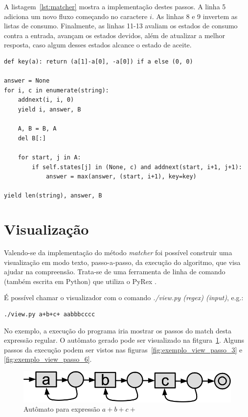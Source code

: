 \documentclass[a4paper,12pt,oneside,onecolumn]{uerj}
\begin{document}
A listagem~\ref{lst:matcher} mostra a implementação destes passos. A linha 5 adiciona um novo fluxo começando no caractere $i$. As linhas 8 e 9 invertem as listas de consumo. Finalmente, as linhas 11-13 avaliam os estados de consumo contra a entrada, avançam os estados devidos, além de atualizar a melhor resposta, caso algum desses estados alcance o estado de aceite.

\vspace{0.5cm}
\begin{lstlisting}[caption={Implementação do método \emph{matcher}},label=lst:matcher]
def key(a): return (a[1]-a[0], -a[0]) if a else (0, 0)

answer = None
for i, c in enumerate(string):
    addnext(i, i, 0)
    yield i, answer, B
    
    A, B = B, A
    del B[:]

    for start, j in A:
        if self.states[j] in (None, c) and addnext(start, i+1, j+1):
            answer = max(answer, (start, i+1), key=key)
    
yield len(string), answer, B
\end{lstlisting}

\section{Visualização}

Valendo-se da implementação do método \emph{matcher} foi possível construir uma visualização em modo texto, passo-a-passo, da execução do algoritmo, que visa ajudar na compreensão. Trata-se de uma ferramenta de linha de comando (também escrita em Python) que utiliza o PyRex .

É possível chamar o visualizador com o comando \emph{./view.py (regex) (input)}, e.g.:

\begin{verbatim}
./view.py a+b+c+ aabbbcccc
\end{verbatim}

No exemplo, a execução do programa iria mostrar os passos do match desta expressão regular. O autômato gerado pode ser visualizado na fitgura~\ref{fig:view_automaton}. Alguns passos da execução podem ser vistos nas figuras~\ref{fig:exemplo_view_passo_3} e \ref{fig:exemplo_view_passo_6}.

\begin{figure}[!htbp]
  \centering
  \includegraphics[scale=0.35]{figures/view_automaton.png}
  \caption{Autômato para expressão $a+b+c+$}
  \label{fig:view_automaton}
\end{figure}
\end{document}
